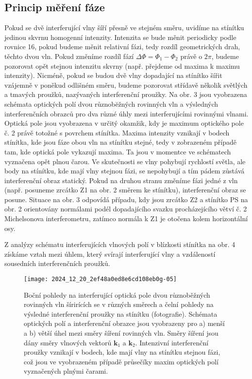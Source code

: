 \documentclass[czech,11pt,a4paper]{article}
\begin{document}
\begin{multicols}{2}
	\section*{Princip měření fáze}
	Pokud se dvě interferující vlny šíří přesně ve stejném směru, uvidíme na stínítku jedinou skvrnu homogenní intenzity. Intenzita se bude měnit periodicky podle rovnice 16, pokud budeme měnit relativní fázi, tedy rozdíl geometrických drah, těchto dvou vln. Pokud změníme rozdíl fází $\Delta \Phi=\Phi_{1}-\Phi_{2}$ právě o $2 \pi$, budeme pozorovat opět stejnou intenzitu skvrny (např. přejdeme od maxima k maximu intenzity). Nicméně, pokud se budou dvě vlny dopadající na stínítko šířit vzájemně v poněkud odlišném směru, budeme pozorovat střídavě několik světlých a tmavých proužků, nazývaných interferenční proužky. Na obr. 3 jsou vyobrazena schémata optických polí dvou různobĕžných rovinných vln a výsledných interferenčních obrazců pro dva různé úhly mezi interferujícími rovinnými vlnami. Optická pole jsou vyobrazena v určitý okamžik, kdy je maximum optického pole č. 2 právě totožné s povrchem stínítka. Maxima intenzity vznikají v bodech stínítka, kde jsou fáze obou vln na stínítku stejné, tedy v zobrazeném případě tam, kde optická pole vykazují maxima. Ta jsou v momentce ve schématech vyznačena opět plnou čarou. Ve skutečnosti se vlny pohybují rychlostí světla, ale body na stínítku, kde mají vlny stejnou fázi, se nepohybují a tím pádem zůstává interferenční obraz statický. Pokud na druhou stranu změníme fázi jedné z vln (např. posuneme zrcátko Z1 na obr. 2 směrem ke stínítku), interferenční obraz se posune. Situace na obr. 3 odpovídá případu, kdy jsou zrcátko Z2 a stínítko PS na obr. 2 orientovány normálami podél dopadajícího svazku procházejícího větví č. 2 Michelsonova interferometru, zatímco normála k Z1 je otočena kolem horizontální osy.
	
	Z analýzy schématu interferujících vlnových polí v blízkosti stínítka na obr. 4 získáme vztah mezi úhlem, který svírají interferující vlny a vzdáleností sousedních interferenčních proužků.\\
	
	\begin{figure}[H]
			\texttt{[image: 2024\_12\_20\_2ef48a0ed8e6cd108eb0g-05]}
			\caption{Boční pohledy na interferující optická pole dvou různoběžných rovinných vln šírirících se v různých směrech a čelní pohledy na výsledné interferenční proužky na stínítku (fotografie). Schémata optických polí a interferenční obrazce jsou vyobrazeny pro a) menší a b) větší úhel mezi směry šíření rovinných vln. Směry šíření jsou dány směry vlnových vektorů $\boldsymbol{k}_{1}$ a $\boldsymbol{k}_{2}$. Intenzivní interferenční proužky vznikají v bodech, kde mají vlny na stínítku stejnou fázi, což jsou ve vyobrazeném případě průsečíky maxim optických polí vyznačených plnými čarami.}
	\end{figure}


\end{multicols}
\end{document}
